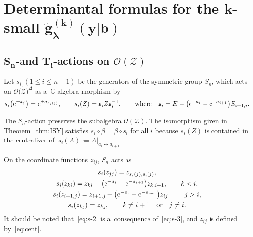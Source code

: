 \documentclass[pdftex]{sigma}
\numberwithin{equation}{section}
\newcommand{\la}{\lambda}
\newcommand{\reg}{\Delta}
\newcommand{\Rep}{{R(T)}}
\def\CC{\mathord{\mathbb{C}}}
\theoremstyle{definition}
\begin{document}
\section[Determinantal formulas for the k-small g\_la\^{}(k)(y|b)]{Determinantal formulas for the $\boldsymbol{k}$-small $\boldsymbol{\tilde{g}_\la^{(k)}(y|b)}$}\label{sec:det}

\subsection[S\_n-and T\_i-actions on O(Z)]{$\boldsymbol{S_n}$-and $\boldsymbol{T_i}$-actions on $\boldsymbol{\mathscr{O}(\mathscr{Z})}$}

Let $s_i$ $(1\le i\le n-1)$ be the generators of the symmetric group $S_n$, which acts on $\mathscr{O}\bigl(\tilde{\mathscr{Z}}\bigr)^{\reg}$ as a~$\CC$-algebra morphism by
\[
s_i\bigl({\rm e}^{\pm a_j}\bigr)={\rm e}^{\pm a_{s_i(j)}},\qquad
s_i(Z)=\mathfrak{s}_iZ\mathfrak{s}_i^{-1},
\qquad \mbox{where} \quad \mathfrak{s}_i=E-\bigl({\rm e}^{-a_i}-{\rm e}^{-a_{i+1}}\bigr)E_{i+1,i}.
\]

The $S_n$-action preserves the subalgebra $\mathscr{O}({\mathscr{Z}})$.
The isomorphism \smash{$\beta\colon\mathscr{O}(\mathscr{Z})\to \hat{\Lambda}_{(n)}^\Rep$} given in Theorem~\ref{thm:ISY} satisfies $s_i\circ\beta=\beta\circ s_i$ for all $i$ because $s_i(Z)$ is contained in the centralizer of~${s_i(A):=A|_{a_i\leftrightarrow a_{i+1}}}$.

On the coordinate functions $z_{ij}$, $S_n$ acts as
\begin{gather}
s_i(z_{jj})=z_{s_i(j),s_i(j)}\label{eq:s-2},\\
s_i(z_{ki})=z_{ki}+\bigl({\rm e}^{-a_i}-{\rm e}^{-a_{i+1}}\bigr)z_{k,i+1},\qquad k<i,\label{eq:s-3}\\
s_i(z_{i+1,j})=z_{i+1,j}-\bigl({\rm e}^{-a_i}-{\rm e}^{-a_{i+1}}\bigr)z_{ij},\qquad j>i,\label{eq:s-4}\\
s_i(z_{kj})=z_{kj},\qquad
k\ne i+1 \quad\text{or}\quad j\ne i.
\label{eq:s-5}
\end{gather}
It should be noted that~\eqref{eq:s-2} is a~consequence of~\eqref{eq:s-3}, and $z_{ij}$ is defined by~\eqref{eq:cent}.
\end{document}
